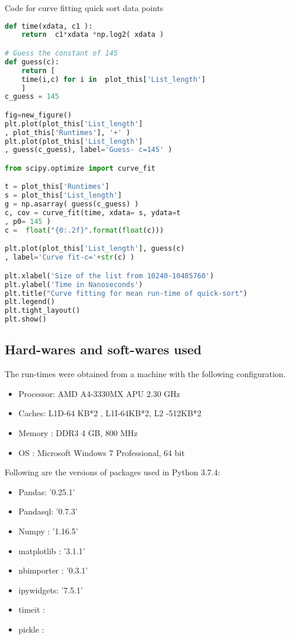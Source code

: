 \documentclass[sigconf, nonacm, natbib, screen, balance=False]{acmart}
\begin{document}
\begin{listing}
  \caption{Code for curve fitting quick sort data points}
  \label{codecurvefit}
\begin{lstlisting}[language=Python]
def time(xdata, c1 ):
    return  c1*xdata *np.log2( xdata )

# Guess the constant of 145
def guess(c):
    return [ 
    time(i,c) for i in  plot_this['List_length']
    ]
c_guess = 145 

fig=new_figure()
plt.plot(plot_this['List_length']
, plot_this['Runtimes'], '+' )
plt.plot(plot_this['List_length']
, guess(c_guess), label='Guess- c=145' )

from scipy.optimize import curve_fit

t = plot_this['Runtimes']
s = plot_this['List_length']
g = np.asarray( guess(c_guess) )
c, cov = curve_fit(time, xdata= s, ydata=t
, p0= 145 )
c =  float("{0:.2f}".format(float(c)))

plt.plot(plot_this['List_length'], guess(c)
, label='Curve fit-c='+str(c) )

plt.xlabel('Size of the list from 10240-10485760')
plt.ylabel('Time in Nanoseconds')
plt.title("Curve fitting for mean run-time of quick-sort")
plt.legend()
plt.tight_layout()
plt.show()
\end{lstlisting}
\end{listing}


\subsection{Hard-wares and soft-wares used}\label{sec:hardwares and softwares}
The run-times were obtained from a machine with the following configuration. 

\begin{itemize}
\item Processor:    AMD A4-3330MX APU  2.30 GHz
\item Caches:       L1D-64 KB*2 , L1I-64KB*2, L2 -512KB*2
\item Memory :      DDR3 4 GB, 800 MHz
\item OS :          Microsoft Windows 7 Professional, 64 bit
\end{itemize}


Following are the versions of packages used in Python 3.7.4:
\begin{multicols}{2}
\begin{itemize}
\item Pandas:    '0.25.1'
\item Pandasql:    '0.7.3'
\item Numpy :      '1.16.5'
\item matplotlib :   '3.1.1'
\item nbimporter :  '0.3.1'
\item ipywidgets: '7.5.1'
\item timeit :         
\item pickle :  
\end{itemize}
\end{multicols}
\end{document}
